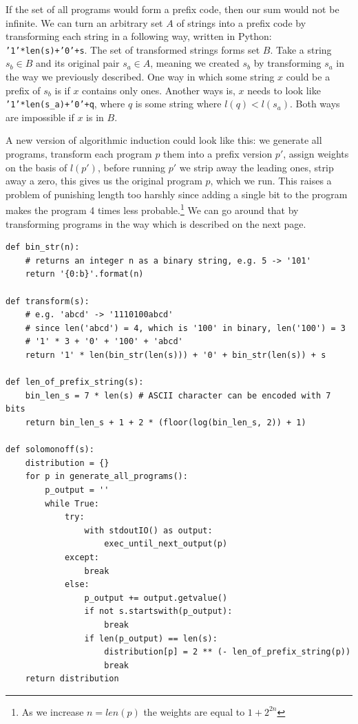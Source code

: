 \documentclass[oneside,hidelinks]{article}
\begin{document}
If the set of all programs would form a prefix code, then our sum would not be infinite.
We can turn an arbitrary set $A$ of strings into a prefix code by transforming each string in a following way, written in Python: \texttt{'1'*len(s)+'0'+s}.
The set of transformed strings forms set $B$.
Take a string $s_b \in B$ and its original pair $s_a \in A$, meaning we created $s_b$ by transforming $s_a$ in the way we previously described.
One way in which some string $x$ could be a prefix of $s_b$ is if $x$ contains only ones.
Another ways is, $x$ needs to look like \texttt{'1'*len(s\_a)+'0'+q}, where $q$ is some string where $l(q) < l(s_a)$.
Both ways are impossible if $x$ is in $B$.

A new version of algorithmic induction could look like this: we generate all programs, transform each program $p$ them into a prefix version $p'$, assign weights on the basis of $l(p')$, before running $p'$ we strip away the leading ones, strip away a zero, this gives us the original program $p$, which we run.
This raises a problem of punishing length too harshly since adding a single bit to the program makes the program 4 times less probable.\footnote{
	As we increase $n = len(p)$ the weights are equal to $1 + 2^{2n}$
}
We can go around that by transforming programs in the way which is described on the next page.

\newpage

\begin{lstlisting}[caption={Algorithmic induction with weights being assigned on the basis of a prefix-coded program. Note that nothing is actually being transformed into a prefix string, the only use of it is to assign weights so to guarantee our sum is $\leq 1$. The rest of the functions being referenced in the code snippet here have been introduced a few pages back and they remain unchanged.}]
def bin_str(n):
	# returns an integer n as a binary string, e.g. 5 -> '101'
	return '{0:b}'.format(n)

def transform(s):
	# e.g. 'abcd' -> '1110100abcd'
	# since len('abcd') = 4, which is '100' in binary, len('100') = 3
	# '1' * 3 + '0' + '100' + 'abcd'
	return '1' * len(bin_str(len(s))) + '0' + bin_str(len(s)) + s

def len_of_prefix_string(s):
	bin_len_s = 7 * len(s) # ASCII character can be encoded with 7 bits
	return bin_len_s + 1 + 2 * (floor(log(bin_len_s, 2)) + 1)

def solomonoff(s):
	distribution = {}
	for p in generate_all_programs():
		p_output = ''
		while True:
			try:
				with stdoutIO() as output:
					exec_until_next_output(p)
			except:
				break
			else:
				p_output += output.getvalue()
				if not s.startswith(p_output):
					break
				if len(p_output) == len(s):
					distribution[p] = 2 ** (- len_of_prefix_string(p))
					break
	return distribution
\end{lstlisting}
\end{document}
